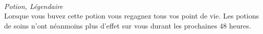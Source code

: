 \\
{\small \it Potion, Légendaire}\\
     Lorsque vous buvez cette potion vous regagnez tous vos point de vie. Les
potions de soins n'ont néanmoins plus d'effet sur vous durant les prochaines 
48 heures. \\


